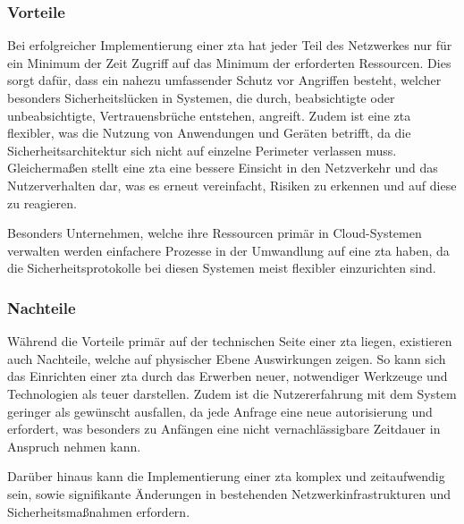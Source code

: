 \subsubsection{Vorteile}\label{subsubsec:vorteile}
Bei erfolgreicher Implementierung einer \gls{zta} hat jeder Teil des Netzwerkes nur für ein Minimum der Zeit Zugriff auf das Minimum der erforderten Ressourcen.
Dies sorgt dafür, dass ein nahezu umfassender Schutz vor Angriffen besteht, welcher besonders Sicherheitslücken in Systemen, die durch, beabsichtigte oder unbeabsichtigte, Vertrauensbrüche entstehen, angreift\autocite[\vglf][]{Edo-2022}.
Zudem ist eine \gls{zta} flexibler, was die Nutzung von Anwendungen und Geräten betrifft, da die Sicherheitsarchitektur sich nicht auf einzelne Perimeter verlassen muss.\autocites[\vglf][]{shore-2021}[\vglf][]{hunter-2020}
Gleichermaßen stellt eine \gls{zta} eine bessere Einsicht in den Netzverkehr und das Nutzerverhalten dar, was es erneut vereinfacht, Risiken zu erkennen und auf diese zu reagieren.\autocite[\vglf][]{shore-2021}

Besonders Unternehmen, welche ihre Ressourcen primär in Cloud-Systemen verwalten werden einfachere Prozesse in der Umwandlung auf eine \gls{zta} haben, da die Sicherheitsprotokolle bei diesen Systemen meist flexibler einzurichten sind.

\subsubsection{Nachteile}\label{subsubsec:nachteile}
Während die Vorteile primär auf der technischen Seite einer \gls{zta} liegen, existieren auch Nachteile, welche auf physischer Ebene Auswirkungen zeigen.
So kann sich das Einrichten einer \gls{zta} durch das Erwerben neuer, notwendiger Werkzeuge und Technologien als teuer darstellen.\autocite[\vglf][]{shore-2021}
Zudem ist die Nutzererfahrung mit dem System geringer als gewünscht ausfallen, da jede Anfrage eine neue \gls{autorisierung} und  erfordert, was besonders zu Anfängen eine nicht vernachlässigbare Zeitdauer in Anspruch nehmen kann.\autocite[\vglf][]{shore-2021}

Darüber hinaus kann die Implementierung einer \gls{zta} komplex und zeitaufwendig sein, sowie signifikante Änderungen in bestehenden Netzwerkinfrastrukturen und Sicherheitsmaßnahmen erfordern.\autocites[\vglf][]{shore-2021}[\vglf][]{buck-2021}